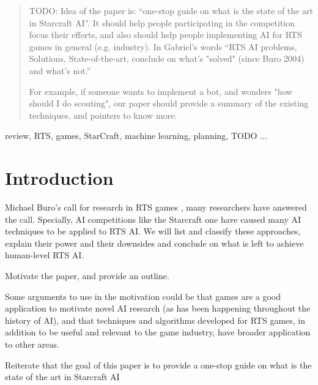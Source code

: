 \documentclass[journal]{IEEEtran}
\begin{document}
\begin{abstract}
TODO: Idea of the paper is: ``one-stop guide on what is the
state of the art in Starcraft AI''. It should help people participating in the competition focus
their efforts, and also should help people implementing AI for RTS games in
general (e.g. industry).  In Gabriel's words ``RTS AI problems, Solutions, State-of-the-art, conclude on what's "solved" (since Buro 2004) and what's not.'' 

For example, if someone wants to implement a bot, and wonders "how should I do scouting", our paper should provide a summary of the existing techniques, and pointers to know more. 
\end{abstract}

\begin{IEEEkeywords}
review, RTS, games, StarCraft, machine learning, planning, TODO ...

\end{IEEEkeywords}

%
\IEEEpeerreviewmaketitle

\section{Introduction}\label{sec:intro}
 Michael Buro's call for research in RTS games \cite{Buro03rts}, many researchers have answered the call. Specially, AI competitions like the Starcraft one have caused many AI techniques to be
applied to RTS AI. We will list and classify these approaches, explain their 
power and their downsides and conclude on what is left to achieve human-level 
RTS AI.

{\color{blue}
Motivate the paper, and provide an outline.

Some arguments to use in the motivation could be that games are a good application to motivate novel AI research (as has been happening throughout the history of AI), and that techniques and algorithms developed for RTS games, in addition to be useful and relevant to the game industry, have broader application to other areas.

Reiterate that the goal of this paper is to provide a one-stop guide on what is the
state of the art in Starcraft AI
}
\end{document}
